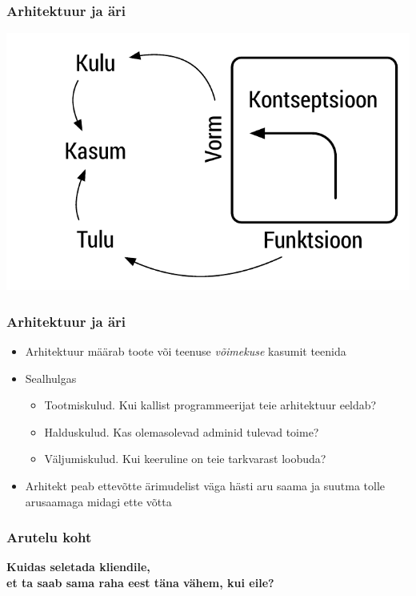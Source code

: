 \begin{frame}[fragile]
  \frametitle{Arhitektuur ja äri}
  	\begin{center}
			\includegraphics[width=.7\textwidth]{ffc_profit.pdf}
	\end{center}
\end{frame}

\begin{frame}[fragile]
	\frametitle{Arhitektuur ja äri}
			\begin{itemize}
				\item Arhitektuur määrab toote või teenuse \emph{võimekuse} kasumit teenida
				\item Sealhulgas
				\begin{itemize}
					\item Tootmiskulud. Kui kallist programmeerijat teie arhitektuur eeldab?
					\item Halduskulud. Kas olemasolevad adminid tulevad toime?
					\item Väljumiskulud. Kui keeruline on teie tarkvarast loobuda?
				\end{itemize}
				\item Arhitekt peab ettevõtte ärimudelist väga hästi aru saama ja suutma tolle arusaamaga midagi ette võtta
			\end{itemize}
\end{frame}

\begin{frame}[fragile]
  \frametitle{Arutelu koht}
		\begin{center}
			\textbf{Kuidas seletada kliendile, \\et ta saab sama raha eest täna vähem, kui eile?}
		\end{center}
\end{frame}

